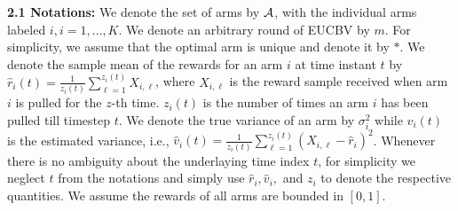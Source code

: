 \textbf{2.1 Notations:} We denote the set of arms by $\mathcal{A}$, with the individual arms labeled $i, i=1,\ldots,K$. We denote an arbitrary round of EUCBV by $m$. For simplicity, we assume that the optimal arm is unique and denote it by ${*}$. We denote the sample mean of the rewards for an arm $i$ at time instant $t$ by $\hat{r}_{i}(t)=\frac{1}{z_{i}(t)}\sum_{\ell=1}^{z_i(t)} X_{i,\ell}$, where $X_{i,\ell}$ is the reward sample received when arm $i$ is pulled for the $z$-th time. $z_i(t)$ is the number of times an arm $i$ has been pulled till timestep $t$. We denote the true variance of an arm by $\sigma_i^{2}$ while $\hat{v}_{i}(t)$ is the estimated variance, i.e., $\hat{v}_{i}(t)=\frac{1}{z_i(t)}\sum_{\ell=1}^{z_{i}(t)}(X_{i,\ell}-\hat{r}_{i})^{2}$. Whenever there is no ambiguity about the underlaying  time index $t$, for simplicity we neglect $t$ from the notations and simply use  $\hat{r}_i, \hat{v}_i,$ and $z_i$ to denote the respective quantities. We assume the rewards of all arms are bounded in $[0,1]$.

